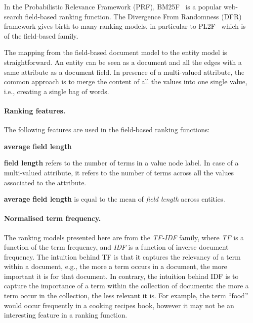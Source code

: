 In the Probabilistic Relevance Framework\cite{Robertson:2009:PRF} (PRF), BM25F~\cite{zaragoza:2004:microsoft} is a popular web-search field-based ranking function.
The Divergence From Randomness\cite{amati:2002:acm} (DFR) framework gives birth to many ranking models, in particular to PL2F~\cite{macdonald:2005:clef} which is of the field-based family.

The mapping from the field-based document model to the entity model is straightforward. An entity can be seen as a document and all the edges with a same attribute as a document field. In presence of a multi-valued attribute, the common approach is to merge the content of all the values into one single value, i.e., creating a single bag of words.

\paragraph{Ranking features.}

The following features are used in the field-based ranking functions:
\begin{labeling}{\textbf{average field length}}
	\item[\textbf{field length}] refers to the number of terms in a value node label. In case of a multi-valued attribute, it refers to the number of terms across all the values associated to the attribute.
	\item[\textbf{average field length}] is equal to the mean of \emph{field length} across entities.
\end{labeling}

\paragraph{Normalised term frequency.}

The ranking models presented here are from the \emph{TF-IDF} family, where \emph{TF} is a function of the term frequency, and \emph{IDF} is a function of inverse document frequency. The intuition behind TF is that it captures the relevancy of a term within a document, e.g., the more a term occurs in a document, the more important it is for that document. In contrary, the intuition behind IDF is to capture the importance of a term within the collection of documents: the more a term occur in the collection, the less relevant it is. For example, the term ``food'' would occur frequently in a cooking recipes book, however it may not be an interesting feature in a ranking function.

